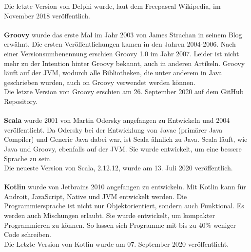\documentclass[ngerman]{article}
\begin{document}
    Die letzte Version von Delphi wurde, laut dem Freepascal Wikipedia, im November 2018 veröffentlich. \cite{DelphiLatestRelease}\\\\
    \textbf{Groovy} wurde das erste Mal im Jahr 2003 von James Strachan in seinem Blog erwähnt. Die ersten Veröffentlichungen kamen in den Jahren 2004-2006. Nach einer Versionsumbenennung erschien Groovy 1.0 im Jahr 2007. Leider ist nicht mehr zu der Intention hinter Groovy bekannt, auch in anderen Artikeln. Groovy läuft auf der JVM, wodurch alle Bibliotheken, die unter anderem in Java geschrieben wurden, auch on Groovy verwendet werden können. \cite{GroovyHistory}\\
    Die letzte Version von Groovy erschien am 26. September 2020 auf dem GitHub Repository. \cite{GroovyLatestRelease}\\\\
    \textbf{Scala} wurde 2001 von Martin Odersky angefangen zu Entwickeln und 2004 veröffentlicht. Da Odersky bei der Entwicklung von Javac (primärer Java Compiler) und Generic Java dabei war, ist Scala ähnlich zu Java. Scala läuft, wie Java und Groovy, ebenfalls auf der JVM. Sie wurde entwickelt, um eine bessere Sprache zu sein. \cite{ScalaHistory}\\
    Die neueste Version von Scala, 2.12.12, wurde am 13. Juli 2020 veröffentlich. \cite{ScalaLatestRelease}\\\\
    \textbf{Kotlin} wurde von Jetbrains 2010 angefangen zu entwickeln. Mit Kotlin kann für Androit, JavaScript, Native und JVM entwickelt werden. Die Programmiersprache ist nicht nur Objektorientiert, sondern auch Funktional. Es werden auch Mischungen erlaubt. Sie wurde entwickelt, um kompakter Programmieren zu können. So lassen sich Programme mit bis zu 40\% weniger Code schreiben. \cite{KotlinHistory}\\
    Die Letzte Version von Kotlin wurde am 07. September 2020 veröffentlicht. \cite{GroovyLatestRelease}\\\\
\end{document}
